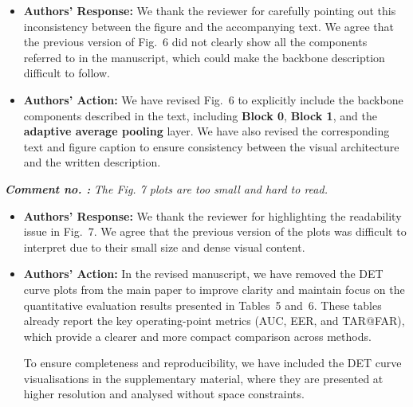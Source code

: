 \documentclass[11pt]{article}
\theoremstyle{remark}
\newcounter{mycounter} %
\newcommand\showReviewcounter{\stepcounter{mycounter}\themycounter}
\begin{document}
\begin{itemize}
	\item \textbf{Authors' Response:} 
	We thank the reviewer for carefully pointing out this inconsistency between the figure and the accompanying text. We agree that the previous version of Fig.~6 did not clearly show all the components referred to in the manuscript, which could make the backbone description difficult to follow.

	\item \textbf{Authors' Action:} 
	We have revised Fig.~6 to explicitly include the backbone components described in the text, including \textbf{Block 0}, \textbf{Block 1}, and the \textbf{adaptive average pooling} layer. We have also revised the corresponding text and figure caption to ensure consistency between the visual architecture and the written description.
\end{itemize}

\color{blue} 
\textbf{\textit{Comment no. \showReviewcounter:}} 
\textit{The Fig. 7 plots are too small and hard to read.}
\color{black}

\begin{itemize}
	\item \textbf{Authors' Response:} 
	We thank the reviewer for highlighting the readability issue in Fig.~7. We agree that the previous version of the plots was difficult to interpret due to their small size and dense visual content.

	\item \textbf{Authors' Action:} 
	In the revised manuscript, we have removed the DET curve plots from the main paper to improve clarity and maintain focus on the quantitative evaluation results presented in Tables~5 and~6. These tables already report the key operating-point metrics (AUC, EER, and TAR@FAR), which provide a clearer and more compact comparison across methods.

	To ensure completeness and reproducibility, we have included the DET curve visualisations in the supplementary material, where they are presented at higher resolution and analysed without space constraints.
\end{itemize}



\setcounter{mycounter}{0}
\color{blue} 
\end{document}
